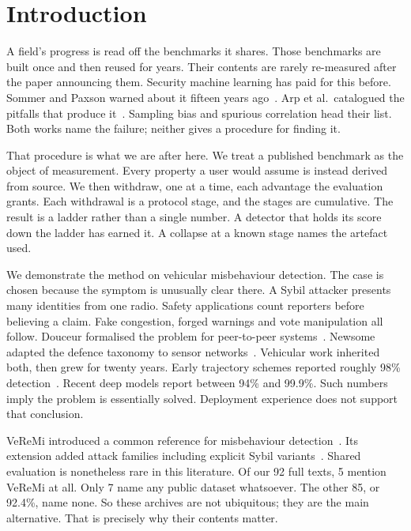 \documentclass[conference]{IEEEtran}
\begin{document}
\section{Introduction}

A field's progress is read off the benchmarks it shares.
Those benchmarks are built once and then reused for years.
Their contents are rarely re-measured after the paper announcing them.
Security machine learning has paid for this before.
Sommer and Paxson warned about it fifteen years ago~\cite{sommer2010}.
Arp et al.\ catalogued the pitfalls that produce it~\cite{arp2022}.
Sampling bias and spurious correlation head their list.
Both works name the failure; neither gives a procedure for finding it.

That procedure is what we are after here.
We treat a published benchmark as the object of measurement.
Every property a user would assume is instead derived from source.
We then withdraw, one at a time, each advantage the evaluation grants.
Each withdrawal is a protocol stage, and the stages are cumulative.
The result is a ladder rather than a single number.
A detector that holds its score down the ladder has earned it.
A collapse at a known stage names the artefact used.

We demonstrate the method on vehicular misbehaviour detection.
The case is chosen because the symptom is unusually clear there.
A Sybil attacker presents many identities from one radio.
Safety applications count reporters before believing a claim.
Fake congestion, forged warnings and vote manipulation all follow.
Douceur formalised the problem for peer-to-peer systems~\cite{douceur2002}.
Newsome adapted the defence taxonomy to sensor networks~\cite{newsome2004}.
Vehicular work inherited both, then grew for twenty years.
Early trajectory schemes reported roughly 98\% detection~\cite{chang2011}.
Recent deep models report between 94\% and 99.9\%.
Such numbers imply the problem is essentially solved.
Deployment experience does not support that conclusion.

VeReMi introduced a common reference for misbehaviour detection~\cite{heijden2018}.
Its extension added attack families including explicit Sybil variants~\cite{kamel2020}.
Shared evaluation is nonetheless rare in this literature.
Of our 92 full texts, 5 mention VeReMi at all.
Only 7 name any public dataset whatsoever.
The other 85, or 92.4\%, name none.
So these archives are not ubiquitous; they are the main alternative.
That is precisely why their contents matter.
\end{document}
